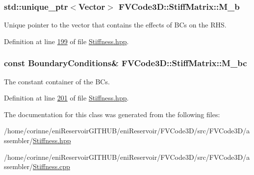 \subsubsection[{\texorpdfstring{M\+\_\+b}{M_b}}]{\setlength{\rightskip}{0pt plus 5cm}std\+::unique\+\_\+ptr$<${\bf Vector}$>$ F\+V\+Code3\+D\+::\+Stiff\+Matrix\+::\+M\+\_\+b\hspace{0.3cm}{\ttfamily [protected]}}\hypertarget{classFVCode3D_1_1StiffMatrix_a5bbfb34d8ef115d2806d5ded5ff109d0}{}\label{classFVCode3D_1_1StiffMatrix_a5bbfb34d8ef115d2806d5ded5ff109d0}


Unique pointer to the vector that contains the effects of B\+Cs on the R\+HS. 



Definition at line \hyperlink{Stiffness_8hpp_source_l00199}{199} of file \hyperlink{Stiffness_8hpp_source}{Stiffness.\+hpp}.

\subsubsection[{\texorpdfstring{M\+\_\+bc}{M_bc}}]{\setlength{\rightskip}{0pt plus 5cm}const {\bf Boundary\+Conditions}\& F\+V\+Code3\+D\+::\+Stiff\+Matrix\+::\+M\+\_\+bc\hspace{0.3cm}{\ttfamily [protected]}}\hypertarget{classFVCode3D_1_1StiffMatrix_a23e3ffc97fcf112958e9966cac41e9d3}{}\label{classFVCode3D_1_1StiffMatrix_a23e3ffc97fcf112958e9966cac41e9d3}


The constant container of the B\+Cs. 



Definition at line \hyperlink{Stiffness_8hpp_source_l00201}{201} of file \hyperlink{Stiffness_8hpp_source}{Stiffness.\+hpp}.



The documentation for this class was generated from the following files\+:\begin{DoxyCompactItemize}
\item 
/home/corinne/eni\+Reservoir\+G\+I\+T\+H\+U\+B/eni\+Reservoir/\+F\+V\+Code3\+D/src/\+F\+V\+Code3\+D/assembler/\hyperlink{Stiffness_8hpp}{Stiffness.\+hpp}\item 
/home/corinne/eni\+Reservoir\+G\+I\+T\+H\+U\+B/eni\+Reservoir/\+F\+V\+Code3\+D/src/\+F\+V\+Code3\+D/assembler/\hyperlink{Stiffness_8cpp}{Stiffness.\+cpp}\end{DoxyCompactItemize}
